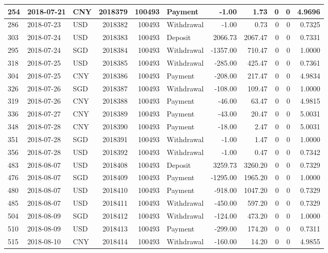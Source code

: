 \documentclass[]{article}
\begin{document}
\begin{table}[H]
\begin{tabular}{l|l|l|r|r|l|r|r|r|r|r}
\hline
254 & 2018-07-21 & CNY & 2018379 & 100493 & Payment & -1.00 & 1.73 & 0 & 0 & 4.9696\\
\hline
286 & 2018-07-23 & USD & 2018382 & 100493 & Withdrawal & -1.00 & 0.73 & 0 & 0 & 0.7325\\
\hline
303 & 2018-07-24 & USD & 2018383 & 100493 & Deposit & 2066.73 & 2067.47 & 0 & 0 & 0.7331\\
\hline
295 & 2018-07-24 & SGD & 2018384 & 100493 & Withdrawal & -1357.00 & 710.47 & 0 & 0 & 1.0000\\
\hline
318 & 2018-07-25 & USD & 2018385 & 100493 & Withdrawal & -285.00 & 425.47 & 0 & 0 & 0.7361\\
\hline
304 & 2018-07-25 & CNY & 2018386 & 100493 & Payment & -208.00 & 217.47 & 0 & 0 & 4.9834\\
\hline
326 & 2018-07-26 & SGD & 2018387 & 100493 & Withdrawal & -108.00 & 109.47 & 0 & 0 & 1.0000\\
\hline
319 & 2018-07-26 & CNY & 2018388 & 100493 & Payment & -46.00 & 63.47 & 0 & 0 & 4.9815\\
\hline
336 & 2018-07-27 & CNY & 2018389 & 100493 & Payment & -43.00 & 20.47 & 0 & 0 & 5.0031\\
\hline
348 & 2018-07-28 & CNY & 2018390 & 100493 & Payment & -18.00 & 2.47 & 0 & 0 & 5.0031\\
\hline
351 & 2018-07-28 & SGD & 2018391 & 100493 & Withdrawal & -1.00 & 1.47 & 0 & 0 & 1.0000\\
\hline
356 & 2018-07-28 & USD & 2018392 & 100493 & Withdrawal & -1.00 & 0.47 & 0 & 0 & 0.7342\\
\hline
483 & 2018-08-07 & USD & 2018408 & 100493 & Deposit & 3259.73 & 3260.20 & 0 & 0 & 0.7329\\
\hline
476 & 2018-08-07 & SGD & 2018409 & 100493 & Payment & -1295.00 & 1965.20 & 0 & 0 & 1.0000\\
\hline
480 & 2018-08-07 & USD & 2018410 & 100493 & Payment & -918.00 & 1047.20 & 0 & 0 & 0.7329\\
\hline
485 & 2018-08-07 & USD & 2018411 & 100493 & Withdrawal & -450.00 & 597.20 & 0 & 0 & 0.7329\\
\hline
504 & 2018-08-09 & SGD & 2018412 & 100493 & Withdrawal & -124.00 & 473.20 & 0 & 0 & 1.0000\\
\hline
510 & 2018-08-09 & USD & 2018413 & 100493 & Payment & -299.00 & 174.20 & 0 & 0 & 0.7311\\
\hline
515 & 2018-08-10 & CNY & 2018414 & 100493 & Withdrawal & -160.00 & 14.20 & 0 & 0 & 4.9855\\

\end{tabular}
\end{table}
\end{document}
